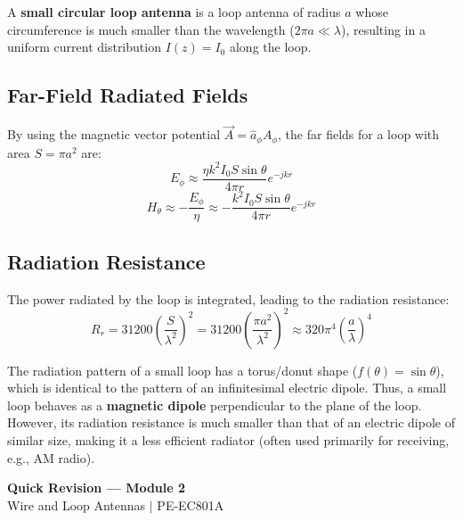 \documentclass[12pt,a4paper]{article}
\begin{document}
\begin{tcolorbox}[defbox, title={\textbf{Definition of Small Circular Loop}}]
A \textbf{small circular loop antenna} is a loop antenna of radius $a$ whose circumference is much smaller than the wavelength ($2\pi a \ll \lambda$), resulting in a uniform current distribution $I(z) = I_0$ along the loop.
\end{tcolorbox}

\subsection{Far-Field Radiated Fields}
By using the magnetic vector potential $\vec{A} = \hat{a}_\phi A_\phi$, the far fields for a loop with area $S = \pi a^2$ are:
\[
E_\phi \approx \frac{\eta k^2 I_0 S \sin\theta}{4\pi r} e^{-jkr}
\]
\[
H_\theta \approx -\frac{E_\phi}{\eta} \approx -\frac{k^2 I_0 S \sin\theta}{4\pi r} e^{-jkr}
\]

\subsection{Radiation Resistance}
The power radiated by the loop is integrated, leading to the radiation resistance:
\[
R_r = 31200 \left( \frac{S}{\lambda^2} \right)^{\!2} = 31200 \left( \frac{\pi a^2}{\lambda^2} \right)^{\!2} \approx 320\pi^4 \left( \frac{a}{\lambda} \right)^{\!4}
\]

\begin{tcolorbox}[defbox, title={\textbf{Important Note: Small Loop as a Magnetic Dipole}}]
The radiation pattern of a small loop has a torus/donut shape ($f(\theta) = \sin\theta$), which is identical to the pattern of an infinitesimal electric dipole. Thus, a small loop behaves as a \textbf{magnetic dipole} perpendicular to the plane of the loop. However, its radiation resistance is much smaller than that of an electric dipole of similar size, making it a less efficient radiator (often used primarily for receiving, e.g., AM radio).
\end{tcolorbox}

\newpage
\begin{center}
  {\large\bfseries\color{myred} Quick Revision --- Module 2}\\[3pt]
  {\small\color{mydark} Wire and Loop Antennas $|$ PE-EC801A}
\end{center}
\noindent{\color{myred}\rule{\linewidth}{1.2pt}}
\vspace{4pt}
\end{document}
